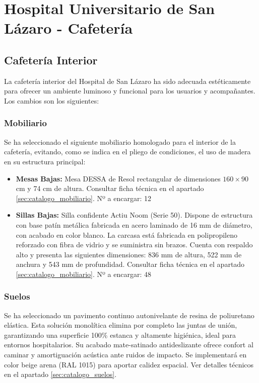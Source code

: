 \documentclass[12pt,a4paper]{article}
\newcommand{\todo}[1]{#1}
\begin{document}
\section{Hospital Universitario de San Lázaro - Cafetería}

\subsection{Cafetería Interior}
La cafetería interior del Hospital de San Lázaro ha sido adecuada estéticamente para ofrecer un ambiente luminoso y funcional para los usuarios y acompañantes. Los cambios son los siguientes:


\subsubsection{Mobiliario}
Se ha seleccionado el siguiente mobiliario homologado para el interior de la cafetería, evitando, como se indica en el pliego de condiciones, el uso de madera en su estructura principal: 
\begin{itemize}
    \item \textbf{Mesas Bajas:} Mesa DESSA de Resol rectangular de dimensiones $160 \times 90$ cm y 74 cm de altura. Consultar ficha técnica en el apartado \ref{sec:catalogo_mobiliario}. \todo{Nº a encargar: 12}
    \item \textbf{Sillas Bajas:} Silla confidente Actiu Noom (Serie 50). Dispone de estructura con base patín metálica fabricada en acero laminado de 16 mm de diámetro, con acabado en color blanco. La carcasa está fabricada en polipropileno reforzado con fibra de vidrio y se suministra sin brazos. Cuenta con respaldo alto y presenta las siguientes dimensiones: 836 mm de altura, 522 mm de anchura y 543 mm de profundidad. Consultar ficha técnica en el apartado \ref{sec:catalogo_mobiliario}. \todo{Nº a encargar: 48}
\end{itemize}

\subsubsection{Suelos}
Se ha seleccionado un pavimento continuo autonivelante de resina de poliuretano elástica. Esta solución monolítica elimina por completo las juntas de unión, garantizando una superficie 100\% estanca y altamente higiénica, ideal para entornos hospitalarios. Su acabado mate-satinado antideslizante ofrece confort al caminar y amortiguación acústica ante ruidos de impacto. Se implementará en color beige arena (RAL 1015) para aportar calidez espacial. Ver detalles técnicos en el apartado \ref{sec:catalogo_suelos}.
\end{document}
